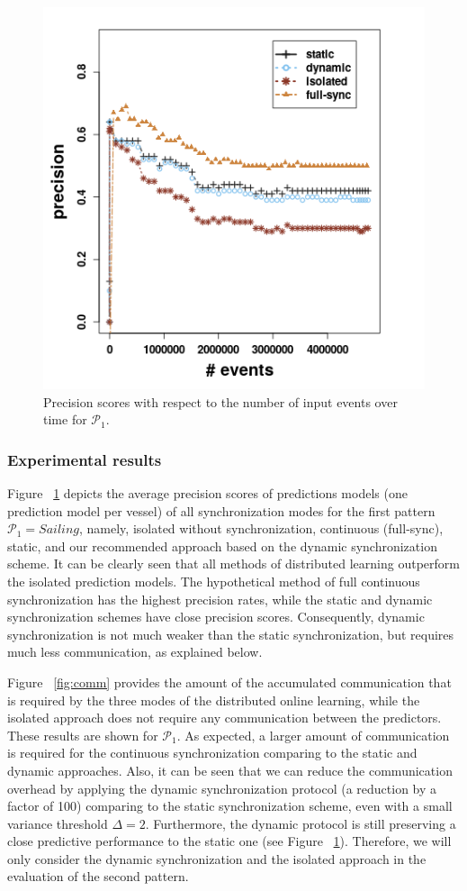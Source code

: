 \begin{figure}[h]
	
	\includegraphics[width=.5\textwidth]{figures/precision_p1.png}
	
	\caption{Precision scores with respect to the number of input events over time for $\mathcal{P}_1$.}
	\label{fig:precsions}
\end{figure}

\subsubsection*{Experimental results} Figure ~\ref{fig:precsions} depicts the average precision scores of predictions models (one prediction model per vessel) of all synchronization modes for the first pattern $\mathcal{P}_1=Sailing$, namely, isolated without synchronization, continuous (full-sync), static, and our recommended approach based on the dynamic synchronization scheme. It can be clearly seen that all methods of distributed learning outperform the isolated prediction models. The hypothetical method of full continuous synchronization has the highest precision rates, while the static and dynamic synchronization schemes have close precision scores. Consequently, dynamic synchronization is not much weaker than the static synchronization, but requires much less communication, as explained below.
 

 
\par Figure ~\ref{fig:comm} provides the amount of the accumulated communication that is required by the three modes of the distributed online learning, while the isolated approach does not require any communication between the predictors. These results are shown  for $\mathcal{P}_1$.  As expected, a larger amount of communication is required for the continuous synchronization comparing to the static and dynamic approaches. Also, it can be seen that we can reduce the communication overhead by applying the dynamic synchronization protocol (a reduction by a factor of 100) comparing to the static synchronization scheme, even with a small variance threshold $\Delta=2$. Furthermore,  the dynamic  protocol is still preserving a close predictive performance to the static one (see Figure ~\ref{fig:precsions}).  Therefore, we will only consider the dynamic synchronization and the isolated approach in the  evaluation of the second pattern.

